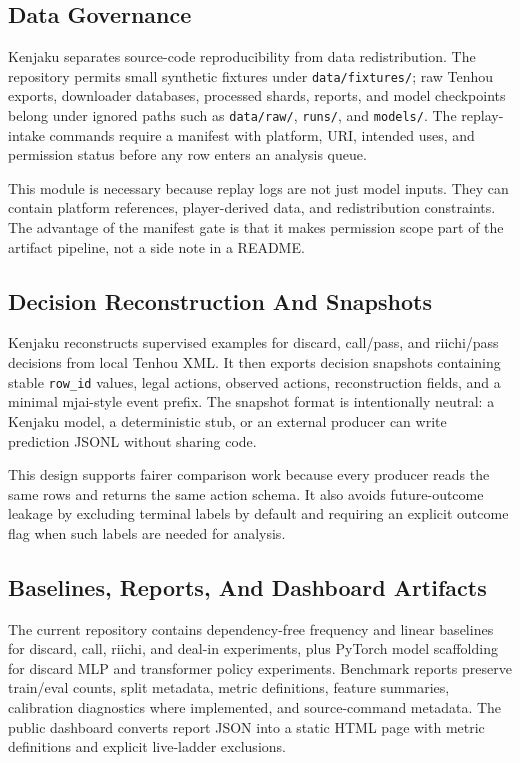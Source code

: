 \documentclass[11pt]{article}
\begin{document}
\subsection{Data Governance}

Kenjaku separates source-code reproducibility from data redistribution. The repository permits
small synthetic fixtures under \texttt{data/fixtures/}; raw Tenhou exports, downloader databases,
processed shards, reports, and model checkpoints belong under ignored paths such as \texttt{data/raw/},
\texttt{runs/}, and \texttt{models/}. The replay-intake commands require a manifest with platform,
URI, intended uses, and permission status before any row enters an analysis queue.

This module is necessary because replay logs are not just model inputs. They can contain platform
references, player-derived data, and redistribution constraints. The advantage of the manifest gate
is that it makes permission scope part of the artifact pipeline, not a side note in a README.

\subsection{Decision Reconstruction And Snapshots}

Kenjaku reconstructs supervised examples for discard, call/pass, and riichi/pass decisions from
local Tenhou XML. It then exports decision snapshots containing stable \texttt{row\_id} values,
legal actions, observed actions, reconstruction fields, and a minimal mjai-style event prefix. The
snapshot format is intentionally neutral: a Kenjaku model, a deterministic stub, or an external
producer can write prediction JSONL without sharing code.

This design supports fairer comparison work because every producer reads the same rows and returns
the same action schema. It also avoids future-outcome leakage by excluding terminal labels by
default and requiring an explicit outcome flag when such labels are needed for analysis.

\subsection{Baselines, Reports, And Dashboard Artifacts}

The current repository contains dependency-free frequency and linear baselines for discard, call,
riichi, and deal-in experiments, plus PyTorch model scaffolding for discard MLP and transformer
policy experiments. Benchmark reports preserve train/eval counts, split metadata, metric
definitions, feature summaries, calibration diagnostics where implemented, and source-command
metadata. The public dashboard converts report JSON into a static HTML page with metric definitions
and explicit live-ladder exclusions.
\end{document}

